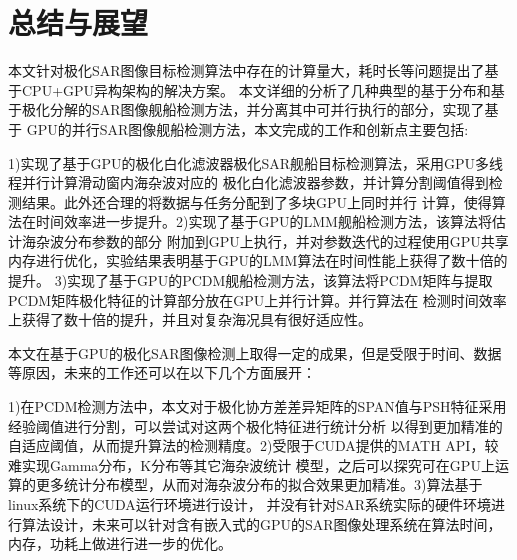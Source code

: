 \chapter{总结与展望}
本文针对极化SAR图像目标检测算法中存在的计算量大，耗时长等问题提出了基于CPU+GPU异构架构的解决方案。
本文详细的分析了几种典型的基于分布和基于极化分解的SAR图像舰船检测方法，并分离其中可并行执行的部分，实现了基于
GPU的并行SAR图像舰船检测方法，本文完成的工作和创新点主要包括:

1)实现了基于GPU的极化白化滤波器极化SAR舰船目标检测算法，采用GPU多线程并行计算滑动窗内海杂波对应的
极化白化滤波器参数，并计算分割阈值得到检测结果。此外还合理的将数据与任务分配到了多块GPU上同时并行
计算，使得算法在时间效率进一步提升。2)实现了基于GPU的LMM舰船检测方法，该算法将估计海杂波分布参数的部分
附加到GPU上执行，并对参数迭代的过程使用GPU共享内存进行优化，实验结果表明基于GPU的LMM算法在时间性能上获得了数十倍的提升。
3)实现了基于GPU的PCDM舰船检测方法，该算法将PCDM矩阵与提取PCDM矩阵极化特征的计算部分放在GPU上并行计算。并行算法在
检测时间效率上获得了数十倍的提升，并且对复杂海况具有很好适应性。

本文在基于GPU的极化SAR图像检测上取得一定的成果，但是受限于时间、数据等原因，未来的工作还可以在以下几个方面展开：

1)在PCDM检测方法中，本文对于极化协方差差异矩阵的SPAN值与PSH特征采用经验阈值进行分割，可以尝试对这两个极化特征进行统计分析
以得到更加精准的自适应阈值，从而提升算法的检测精度。2)受限于CUDA提供的MATH API，较难实现Gamma分布，K分布等其它海杂波统计
模型，之后可以探究可在GPU上运算的更多统计分布模型，从而对海杂波分布的拟合效果更加精准。3)算法基于linux系统下的CUDA运行环境进行设计，
并没有针对SAR系统实际的硬件环境进行算法设计，未来可以针对含有嵌入式的GPU的SAR图像处理系统在算法时间，内存，功耗上做进行进一步的优化。


